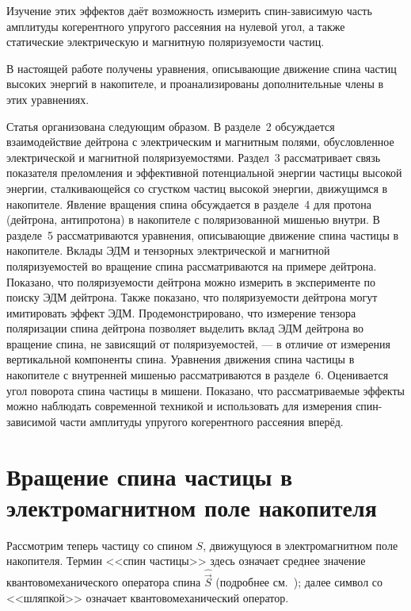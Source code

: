 \documentclass[11pt,a4paper]{article}
\newcommand{\hvec}[1]{\hat{\vec{#1}}}
\begin{document}
Изучение этих эффектов даёт возможность измерить спин-зависимую часть
амплитуды когерентного упругого рассеяния на нулевой угол, а также
статические электрическую и магнитную поляризуемости частиц.

В настоящей работе получены уравнения, описывающие движение спина
частиц высоких энергий в накопителе, и проанализированы дополнительные
члены в этих уравнениях.

Статья организована следующим образом. В разделе~2 обсуждается
взаимодействие дейтрона с электрическим и магнитным полями, обусловленное
электрической и магнитной поляризуемостями. Раздел~3 рассматривает связь
показателя преломления и эффективной потенциальной энергии частицы высокой
энергии, сталкивающейся со сгустком частиц высокой энергии, движущимся
в накопителе. Явление вращения спина обсуждается в разделе~4 для протона
(дейтрона, антипротона) в накопителе с поляризованной мишенью внутри.
В разделе~5 рассматриваются уравнения, описывающие движение спина частицы
в накопителе. Вклады ЭДМ и тензорных электрической и магнитной
поляризуемостей во вращение спина рассматриваются на примере дейтрона.
Показано, что поляризуемости дейтрона можно измерить в эксперименте
по поиску ЭДМ дейтрона. Также показано, что поляризуемости дейтрона
могут имитировать эффект ЭДМ. Продемонстрировано, что измерение тензора
поляризации спина дейтрона позволяет выделить вклад ЭДМ дейтрона
во вращение спина, не зависящий от поляризуемостей, --- в отличие
от измерения вертикальной компоненты спина. Уравнения движения спина
частицы в накопителе с внутренней мишенью рассматриваются в разделе~6.
Оценивается угол поворота спина частицы в мишени. Показано, что
рассматриваемые эффекты можно наблюдать современной техникой и использовать
для измерения спин-зависимой части амплитуды упругого когерентного
рассеяния вперёд.

\section{Вращение спина частицы в электромагнитном поле накопителя}

Рассмотрим теперь частицу со спином $S$, движущуюся в электромагнитном
поле накопителя. Термин <<спин частицы>> здесь означает среднее значение
квантовомеханического оператора спина $\hvec{S}$ (подробнее см.~\cite{Mane05});
далее символ со <<шляпкой>> означает квантовомеханический оператор.
\end{document}
